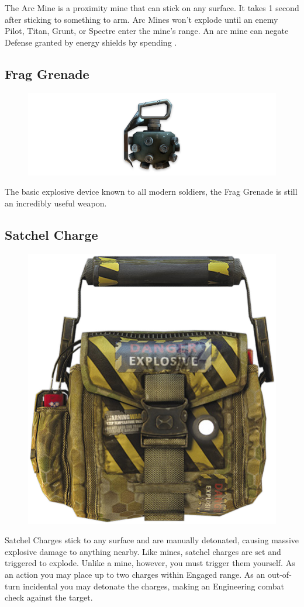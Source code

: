 \documentclass[9pt, openany]{extbook}
\begin{document}
The Arc Mine is a proximity mine that can stick on any surface. It takes 1 second after sticking to something to arm. Arc Mines won't explode until an enemy Pilot, Titan, Grunt, or Spectre enter the mine's range. An arc mine can negate Defense granted by energy shields by spending \Advantage\Advantage.


\subsection{Frag Grenade}
\begin{figure}
\vspace*{-2em}
\includegraphics[width=\linewidth]{FragGrenade}
\end{figure}

The basic explosive device known to all modern soldiers, the Frag Grenade is still an incredibly useful weapon.

\subsection{Satchel Charge}
\begin{figure}
\vspace*{-2em}
\centering
\includegraphics[width=.4\linewidth]{SatchelCharge}
\end{figure}

Satchel Charges stick to any surface and are manually detonated, causing massive explosive damage to anything nearby. Like mines, satchel charges are set and triggered to explode. Unlike a mine, however, you must trigger them yourself. As an action you may place up to two charges within Engaged range. As an out-of-turn incidental you may detonate the charges, making an Engineering combat check against the target.
\end{document}
